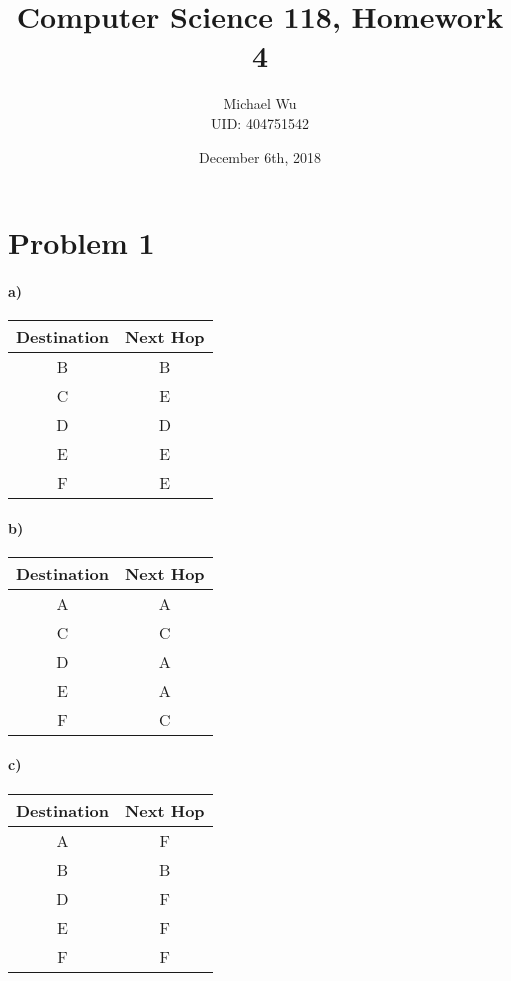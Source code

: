 \documentclass[12pt]{article}
\begin{document}
\title{Computer Science 118, Homework 4}
\date{December 6th, 2018}
\author{Michael Wu\\UID: 404751542}
\maketitle

\section*{Problem 1}

\paragraph{a)}

\begin{center}
    \begin{tabular}{c|c}
        Destination & Next Hop \\
        \hline
        B & B\\
        C & E\\
        D & D\\
        E & E\\
        F & E
    \end{tabular}
\end{center}

\paragraph{b)}

\begin{center}
    \begin{tabular}{c|c}
        Destination & Next Hop \\
        \hline
        A & A\\
        C & C\\
        D & A\\
        E & A\\
        F & C
    \end{tabular}
\end{center}

\paragraph{c)}

\begin{center}
    \begin{tabular}{c|c}
        Destination & Next Hop \\
        \hline
        A & F\\
        B & B\\
        D & F\\
        E & F\\
        F & F
    \end{tabular}
\end{center}
\end{document}
